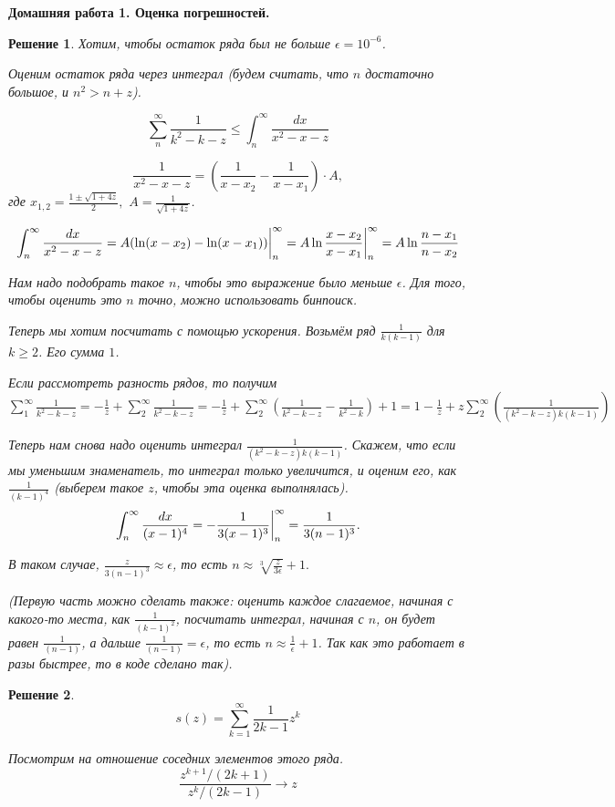 \documentclass[12pt,fleqn,a4paper]{article}
\newtheorem*{solution}{Решение}
\newenvironment{task}[2] {
	\noindent\fbox{\bf {#1} {#2}.}
}{
}
\newcommand{\mytitle}[2] {
	\begin{center}
		\bf {#1} {#2}.
	\end{center}
}
\begin{document}
	\mytitle{Домашняя работа 1.}{Оценка погрешностей}
	
	\begin{task}{}{1}
	\end{task}
	\begin{solution}
	Хотим, чтобы остаток ряда был не больше $\epsilon = 10^{-6}$.
	
	Оценим остаток ряда через интеграл (будем считать, что $n$ достаточно большое, и $n^2 > n + z$).
	
	$$\sum_{n}^{\infty} \frac{1}{k^2 - k - z} \le \int_{n}^{\infty} \frac{dx}{x^2 - x - z}$$
	
	$$\frac{1}{x^2 - x - z} = (\frac{1}{x - x_2} - \frac{1}{x - x_1}) \cdot A,$$ где $x_{1, 2} = \frac{1 \pm \sqrt{1 + 4z}}{2}, \,\,  A = \frac{1}{\sqrt{1 + 4z}}$.

    $$ \int_{n}^{\infty} \frac{dx}{x^2 - x - z} = A( \ln (x - x_2) - \ln(x - x_1)) \bigg{|}_{n}^{\infty} = A \ln \frac{x - x_2}{x - x_1} \bigg{|}_{n}^{\infty} = A \ln \frac{n - x_1}{n - x_2}$$
    
    Нам надо подобрать такое $n$, чтобы это выражение было меньше $\epsilon$. Для того, чтобы оценить это $n$ точно, можно использовать бинпоиск.
    
    
    Теперь мы хотим посчитать с помощью ускорения. Возьмём ряд $\frac{1}{k(k - 1)}$ для $k \ge 2$. Его сумма $1$.
    
    Если рассмотреть разность рядов, то получим $\sum_{1}^{\infty} \frac{1}{k^2 - k - z} = - \frac{1}{z} + \sum_{2}^{\infty} \frac{1}{k^2 - k - z} = - \frac{1}{z} + \sum_{2}^{\infty} (\frac{1}{k^2 - k - z} - \frac{1}{k^2 - k}) + 1 = 1 - \frac{1}{z} + z \sum_{2}^{\infty}  (\frac{1}{(k^2 - k - z)k (k - 1)})$
    
    Теперь нам снова надо оценить интеграл $\frac{1}{(k^2 - k - z)k (k - 1)}$. Скажем, что если мы уменьшим знаменатель, то интеграл только увеличится, и оценим его, как $\frac{1}{(k - 1)^4}$ (выберем такое $z$, чтобы эта оценка выполнялась). $$\int_{n}^{\infty} \frac{dx}{(x - 1)^4} = -\frac{1}{3(x - 1)^3}\bigg{|}_{n}^{\infty} = \frac{1}{3(n - 1)^3}.$$
    
    В таком случае, $\frac{z}{3 (n - 1)^ 3} \approx \epsilon$, то есть $n \approx \sqrt[3]{\frac{z}{3 \epsilon}} + 1.$
    
    (Первую часть можно сделать также: оценить каждое слагаемое, начиная с какого-то места, как $\frac{1}{(k - 1)^2}$, посчитать интеграл, начиная с $n$, он будет равен $\frac{1}{(n - 1)}$, а дальше $\frac{1}{(n - 1)} =  \epsilon$, то есть $n \approx \frac{1}{\epsilon} + 1$. Так как это работает в разы быстрее, то в коде сделано так).
    
	\end{solution}

	\begin{task}{}{2}
\end{task}
\begin{solution}
	$$s(z) = \sum_{k = 1}^{\infty} \frac{1}{2k - 1} z^{k}$$
	
	Посмотрим на отношение соседних элементов этого ряда. $$\frac{z^{k + 1} / (2 k + 1)}{z^k / (2k -1)} \rightarrow z$$
\end{solution}
	
	
	
	
\end{document}
